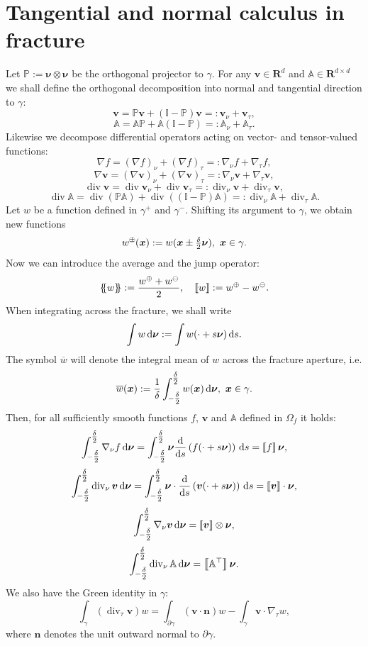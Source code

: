 \documentclass[a4paper]{article}
\def\avg#1{\left\{\mskip-5mu\left\{#1\right\}\mskip-5mu\right\}}
\def\d {\,{\rm d}}
\def\div{\operatorname{div}}
\def\dn{\d\nnu}
\def\jmp#1{\left\llbracket #1 \right\rrbracket}
\def\nn{\vc n}
\def\nnu{\vc\nu}
\def\prtl{\partial}
\def\Real{{\mathbf R}}
\def\tn#1{{\mathbb{#1}}}    %
\def\vc#1{\mathbf{\boldsymbol{#1}}}     %
\def\vv{\vc v}
\def\xx{\vc x}
\newcommand{\eq}[1]{\begin{equation}#1\end{equation}}
\newcommand{\opm}{ %
  {\mathbin{
    \mathchoice
      {\buildcirclepm{\displaystyle     }{0.14ex}{0.95}{0.05ex}{.7}}
      {\buildcirclepm{\textstyle        }{0.14ex}{0.95}{0.05ex}{.7}}
      {\buildcirclepm{\scriptstyle      }{0.13ex}{0.955}{0.04ex}{.55}}
      {\buildcirclepm{\scriptscriptstyle}{0.08ex}{0.95}{0.03ex}{.45}}
  }} 
}
\newcommand\buildcirclepm[5]{%
  \begin{tikzpicture}[baseline=(X.base), inner sep=-#5, outer sep=-.65]
    \node[draw,circle,line width=#4] (X)  {\footnotesize\raisebox{#2}{\scalebox{#3}{$#1\pm$}}};
  \end{tikzpicture}%
}
\begin{document}
\section{Tangential and normal calculus in fracture}\label{sec:calculus}

Let $\tn P := \nnu\otimes\nnu$ be the orthogonal projector to $\gamma$.
For any $\vv\in\Real^d$ and $\tn A\in\Real^{d\times d}$ we shall define the orthogonal decomposition into normal and tangential direction to $\gamma$:
\eq{ \vv = \tn P\vv + (\tn I-\tn P)\vv =:\vv_\nu + \vv_\tau, }
\eq{ \tn A = \tn A\tn P + \tn A(\tn I-\tn P) =: \tn A_\nu + \tn A_\tau. }
Likewise we decompose differential operators acting on vector- and tensor-valued functions:
\eq{ \label{eq:grad_sc} \nabla f = (\nabla f)_\nu + (\nabla f)_\tau =: \nabla_\nu f + \nabla_\tau f, }
\eq{ \label{eq:grad_vc} \nabla\vv = (\nabla\vv)_\nu + (\nabla\vv)_\tau =: \nabla_\nu\vv + \nabla_\tau\vv, }
\eq{ \div\vv = \div\vv_\nu + \div\vv_\tau =: \div_\nu\vv + \div_\tau\vv, }
\eq{ \label{eq:div_tn} \div\tn A = \div(\tn P\tn A) + \div((\tn I-\tn P)\tn A) =: \div_\nu\tn A + \div_\tau\tn A. }
Let $w$ be a function defined in $\gamma^+$ and $\gamma^-$.
Shifting its argument to $\gamma$, we obtain new functions
\eq{ w^{\opm}(\xx) := w(\xx\pm\tfrac\delta2\nnu), ~\xx\in\gamma. }
Now we can introduce the average and the jump operator:
\eq{ \avg{w} := \frac{w^\oplus+w^\ominus}2,\quad \jmp{w} := w^\oplus-w^\ominus. }
When integrating across the fracture, we shall write
\[ \int w\dn := \int w(\cdot+s\nnu)\d s. \]
The symbol $\overline w$ will denote the integral mean of $w$ across the fracture aperture, i.e.
\eq{\label{eq:def_mean} \overline w(\xx):=\frac1\delta\int_{-\tfrac\delta2}^{\tfrac\delta2} w(\xx) \dn,~\xx\in\gamma. }
Then, for all sufficiently smooth functions $f$, $\vv$ and $\tn A$ defined in $\Omega_f$ it holds:
\eq{ \label{eq:int_grad_nu_sc}
\int_{-\tfrac\delta2}^{\tfrac\delta2}\nabla_\nu f\dn = \int_{-\tfrac\delta2}^{\tfrac\delta2}\nnu\frac{\rm d}{{\rm d}s}\left(f(\cdot+s\nnu)\right)\d s = \jmp{f}\nnu,
}
\eq{ \label{eq:div_nu_vc}
\int_{-\tfrac\delta2}^{\tfrac\delta2}\div_\nu\vv\dn = \int_{-\tfrac\delta2}^{\tfrac\delta2}\nnu\cdot\frac{\rm d}{{\rm d}s}\left(\vv(\cdot+s\nnu)\right)\d s = \jmp{\vv}\cdot\nnu,
}
\eq{ \label{eq:int_grad_nu_vc} \int_{-\tfrac\delta2}^{\tfrac\delta2}\nabla_\nu\vv\dn = \jmp{\vv}\otimes\nnu, }
\eq{ \label{eq:int_div_nu_tn} \int_{-\tfrac\delta2}^{\tfrac\delta2}\div_\nu\tn A \dn = \jmp{\tn A^\top}\nnu. }
We also have the Green identity in $\gamma$:
\eq{ \int_\gamma(\div_\tau\vv)w = \int_{\prtl\gamma}(\vv\cdot\nn)w - \int_\gamma\vv\cdot\nabla_\tau w, }
where $\nn$ denotes the unit outward normal to $\partial\gamma$.
\end{document}
